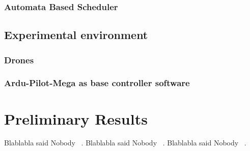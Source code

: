 \documentclass[11pt]{article}
\begin{document}
\subsubsection{Automata Based Scheduler}


\subsection{Experimental environment}
\subsubsection{Drones}
\subsubsection{Ardu-Pilot-Mega as base controller software}

\section{Preliminary Results}
Blablabla said Nobody ~\cite{Merav}.
Blablabla said Nobody ~\cite{APM}.
Blablabla said Nobody ~\cite{RTComposer}.



    
    {}
\end{document}
